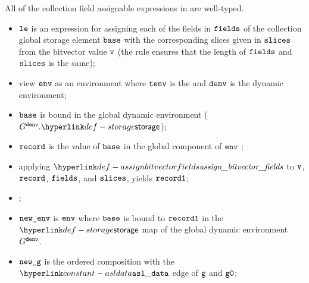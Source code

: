 
All of the collection field assignable expressions in
 are well-typed.

\ProseParagraph
\AllApply
\begin{itemize}
  \item $\vle$ is an expression for assigning each of the fields in $\fields$
    of the collection global storage element $\vbase$ with the corresponding
    slices given in $\vslices$ from the bitvector value $\vv$ (the rule
     ensures that the length of $\fields$ and
    $\vslices$ is the same);
  \item view $\env$ as an environment where $\tenv$ is the \staticenvironmentterm{}
    and $\denv$ is the dynamic environment;
  \item $\vbase$ is bound in the global dynamic environment ($G^\denv.\storage$);
  \item $\record$ is the value of $\vbase$ in the global component of $\env$ ;
  \item applying $\assignbitvectorfields$ to $\vv$, $\record$,
    $\fields$, and $\vslices$, yields $\recordone$\ProseOrError;
  \item {};
  \item $\newenv$ is $\env$ where $\vbase$ is bound to $\recordone$ in the $\storage$ map
    of the global dynamic environment $G^\denv$.
  \item $\newg$ is the ordered composition with the $\asldata$ edge of $\vg$
    and $\vgzero$;
\end{itemize}

\FormallyParagraph
\begin{mathpar}
\end{mathpar}

